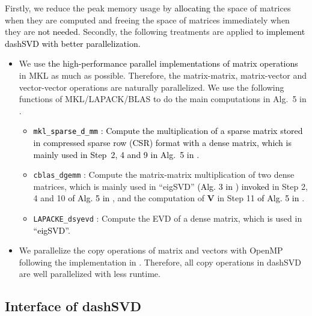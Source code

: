 \documentclass{ol-softwaremanual}
\newcommand{\atn}[1]{\textcolor{black}{#1}}
\newcommand{\atnn}[1]{\textcolor{black}{#1}}
\begin{document}
Firstly, we reduce the peak memory usage by \atnn{allocating} the space of matrices when they are computed
and freeing the space of matrices immediately when they are \atnn{not needed}. Secondly, the following treatments are applied \atn{to implement dashSVD with better parallelization.}
\begin{itemize}
	\item We use \atnn{the high-performance parallel implementations of matrix operations} in MKL as much as possible. Therefore, the matrix-matrix, matrix-vector and vector-vector operations are naturally parallelized. We use the following functions of MKL/LAPACK/BLAS to do the main computations in Alg.~5 in \cite{dashSVD}.%
	\begin{itemize}
		\item \atn{\texttt{mkl\_sparse\_d\_mm} : Compute the multiplication of a sparse matrix stored in \atnn{compressed sparse row (CSR)} format with a dense matrix, which is mainly used in Step~2, 4 and 9 in Alg.~5 in \cite{dashSVD}.}  
		\item \texttt{cblas\_dgemm} : Compute the matrix-matrix multiplication of two dense matrices, which is mainly used in ``eigSVD'' \atnn{(Alg. 3 in \cite{dashSVD}) invoked} in Step 2, 4 and 10 \atnn{of Alg. 5 in \cite{dashSVD}}, and the computation of $\mathbf{V}$ in Step 11 \atnn{of Alg. 5 in \cite{dashSVD}}.
		\item \texttt{LAPACKE\_dsyevd} : Compute the EVD of a dense matrix, which is used in  \atnn{``eigSVD''}.
	\end{itemize}
	\item We parallelize the copy operations of matrix and vectors with OpenMP following the implementation in \cite{martinsson2016randomized2} \cite{randqb-code}. Therefore, all copy operations in dashSVD are well parallelized with less runtime.
\end{itemize}



\subsection{Interface of dashSVD}
\end{document}
